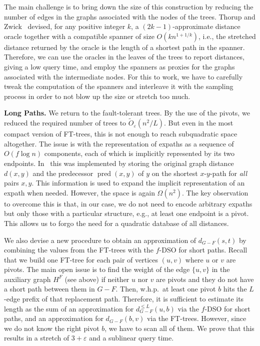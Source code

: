 \documentclass{theoretics}
\DeclareMathOperator{\pred}{pred}
\newcommand*{\Otilde}{\widetilde{O}}
\renewcommand{\le}{\leqslant}
\begin{document}
The main challenge is to bring down the size of this construction 
by reducing the number of edges in the graphs associated
with the nodes of the trees.
Thorup and Zwick~\cite{ThorupZ05} devised, for any positive integer $k$,
a $(2k{-}1)$-approximate distance oracle together with a compatible spanner of size $O(kn^{1+1/k})$, 
i.e., the stretched distance returned by the oracle 
is the length of a shortest path in the spanner.
Therefore, we can use the oracles in the leaves of the trees to report distances,
giving a low query time,
and employ the spanners as proxies for the graphs associated with the intermediate nodes.
For this to work, we have to carefully tweak the computation of the spanners
and interleave it with the sampling process 
in order to not blow up the size or stretch too much.
\vspace*{.5em}

\noindent
\textbf{Long Paths.}
We return to the fault-tolerant trees.
By the use of the pivots, we reduced the required number of trees to $\Otilde_{\varepsilon}(n^2/L)$.
But even in the most compact version of FT-trees, this is not enough 
to reach subquadratic space altogether.
The issue is with the representation of expaths as a sequence of $O(f \log n)$ components,
each of which is implicitly represented by its two endpoints.
In~\cite{ChCoFiKa17} this was implemented by storing the original graph distance $d(x,y)$ 
and the predecessor $\pred(x,y)$ of $y$ on the shortest $x$-$y$-path for \emph{all} pairs $x,y$.
This information is used to expand the implicit representation of an expath when needed.
However, the space is again $\Omega(n^2)$.
The key observation to overcome this is that, in our case,
we do not need to encode arbitrary expaths but only those with a particular structure,
e.g., at least one endpoint is a pivot.
This allows us to forgo the need for a quadratic database of all distances. 

We also devise a new procedure to obtain an approximation of $d_{G-F}(s,t)$
by combining the values from the FT-trees with the $f$-DSO for short paths.
Recall that we build one FT-tree for each pair of vertices $(u,v)$ where $u$ or $v$ are pivots.
The main open issue is to find the weight of the edge $\{u,v\}$ in the auxiliary graph $H^F$ 
(see above)
if neither $u$ nor $v$ are pivots and they do not have a short path between them in $G-F$.
Then, w.h.p.\ at least one pivot $b$ hits the $L$-edge prefix of that replacement path.
Therefore, it is sufficient to estimate its length as the sum of an approximation for 
$d_{G-F}^{\le L}(u,b)$ via the $f$-DSO for short paths, 
and an approximation for $d_{G-F}(b,v)$ via the FT-trees.
However, since we do not know the right pivot $b$, we have to scan all of them.
We prove that this results in a stretch of $3+\varepsilon$ and a sublinear query time.
\end{document}
